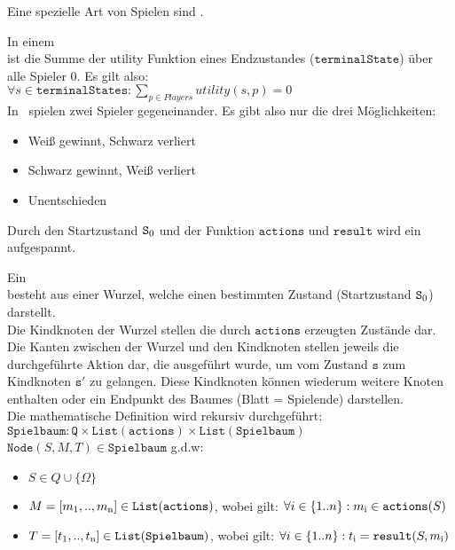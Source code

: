 Eine spezielle Art von Spielen sind .
\begin{Definition}
In einem \\ ist die Summe der utility Funktion eines Endzustandes ($\mathtt{terminalState}$) über alle Spieler 0. Es gilt also:
\vspace{0.2cm}
\\$\forall s \in \mathtt{terminalStates}: \sum\limits_{p \in Players} utility(s, p) = 0$
\vspace{0.2cm}
\\In \ot\ spielen zwei Spieler gegeneinander. Es gibt also nur die drei Möglichkeiten:
\begin{itemize}
\item Weiß gewinnt, Schwarz verliert
\item Schwarz gewinnt, Weiß verliert
\item Unentschieden
\end{itemize}
\end{Definition}
Durch den Startzustand $\mathtt{S\textsubscript{0}}$ und der Funktion $\mathtt{actions}$ und $\mathtt{result}$ wird ein  aufgespannt.
\begin{Definition}
Ein  \\besteht aus einer Wurzel, welche einen bestimmten Zustand (Startzustand $\mathtt{S\textsubscript{0}}$) darstellt.\\ Die Kindknoten der Wurzel stellen die durch $\mathtt{actions}$ erzeugten Zustände dar. Die Kanten zwischen der Wurzel und den Kindknoten stellen jeweils die durchgeführte Aktion dar, die ausgeführt wurde, um vom Zustand $\mathtt{s}$ zum Kindknoten $\mathtt{s'}$ zu gelangen. Diese Kindknoten können wiederum weitere Knoten enthalten oder ein Endpunkt des Baumes (Blatt = Spielende) %
 darstellen.
\\Die mathematische Definition wird rekursiv durchgeführt:
\\$\mathtt{Spielbaum}: \mathtt{Q} \times \mathtt{List(actions)} \times \mathtt{List(Spielbaum)}$
\\$\mathtt{Node}(S,M,T) \in \mathtt{Spielbaum}$ g.d.w:
\begin{itemize}
\item $S \in Q \cup \{\Omega\}$
\item $M = [m\textsubscript{1}, .. , m \textsubscript{n}] \in \mathtt{List(actions)}$, wobei gilt:  $\forall i \in \{1 .. n\}: m\textsubscript{i} \in \mathtt{actions}(S) $
\item $T = [t\textsubscript{1}, .. , t \textsubscript{n}] \in \mathtt{List(Spielbaum)}$, wobei gilt: $ \forall i \in \{1 .. n\}: t\textsubscript{i} = \mathtt{result}(S, m\textsubscript{i}) $
\end{itemize}
\end{Definition}
